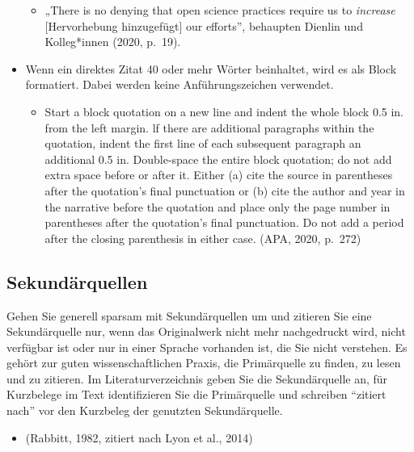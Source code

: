 \documentclass[
  letterpaper,
  DIV=11]{scrreprt}
\providecommand{\tightlist}{%
  \setlength{\itemsep}{0pt}\setlength{\parskip}{0pt}}\usepackage{longtable,booktabs,array}
\begin{document}
\begin{itemize}
  \begin{itemize}
  \tightlist
  \item
    „There is no denying that open science practices require us to
    \emph{increase} {[}Hervorhebung hinzugefügt{]} our efforts'',
    behaupten Dienlin und Kolleg*innen (2020, p.~19).
  \end{itemize}
\item
  Wenn ein direktes Zitat 40 oder mehr Wörter beinhaltet, wird es als
  Block formatiert. Dabei werden keine Anführungszeichen verwendet.

  \begin{itemize}
  \tightlist
  \item
    Start a block quotation on a new line and indent the whole block 0.5
    in. from the left margin. lf there are additional paragraphs within
    the quotation, indent the first line of each subsequent paragraph an
    additional 0.5 in. Double-space the entire block quotation; do not
    add extra space before or after it. Either (a) cite the source in
    parentheses after the quotation's final punctuation or (b) cite the
    author and year in the narrative before the quotation and place only
    the page number in parentheses after the quotation's final
    punctuation. Do not add a period after the closing parenthesis in
    either case. (APA, 2020, p.~272)
  \end{itemize}
\end{itemize}

\subsection{Sekundärquellen}\label{sekunduxe4rquellen}

Gehen Sie generell sparsam mit Sekundärquellen um und zitieren Sie eine
Sekundärquelle nur, wenn das Originalwerk nicht mehr nachgedruckt wird,
nicht verfügbar ist oder nur in einer Sprache vorhanden ist, die Sie
nicht verstehen. Es gehört zur guten wissenschaftlichen Praxis, die
Primärquelle zu finden, zu lesen und zu zitieren. Im
Literaturverzeichnis geben Sie die Sekundärquelle an, für Kurzbelege im
Text identifizieren Sie die Primärquelle und schreiben ``zitiert nach''
vor den Kurzbeleg der genutzten Sekundärquelle.

\begin{itemize}
\tightlist
\item
  (Rabbitt, 1982, zitiert nach Lyon et al., 2014)
\end{itemize}
\end{document}

